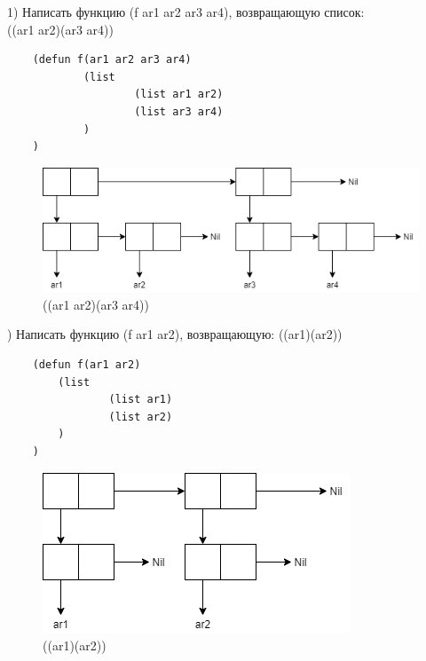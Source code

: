 \documentclass[a4paper, 12pt]{article}
\begin{document}

\lstset{style=mystyle}
1) Написать функцию (f ar1 ar2 ar3 ar4), возвращающую список: \\((ar1 ar2)(ar3 ar4))
\begin{lstlisting}
	(defun f(ar1 ar2 ar3 ar4)
			(list
					(list ar1 ar2)
					(list ar3 ar4)
			)
	)
\end{lstlisting}
\begin{figure}[h!]
	\centering \includegraphics[scale=0.8]{1}
	\centering\caption{((ar1 ar2)(ar3 ar4))}
\end{figure}
\clearpage
{}) Написать функцию (f ar1 ar2), возвращающую: ((ar1)(ar2))
\begin{lstlisting}
	(defun f(ar1 ar2)
		(list
				(list ar1)
				(list ar2)
		)
	)
\end{lstlisting}
\begin{figure}[h!]
	\centering \includegraphics[scale=1]{2}
	\centering\caption{((ar1)(ar2))}
\end{figure}
\end{document}
